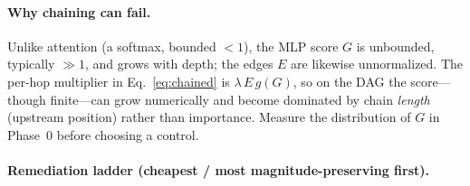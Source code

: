 \documentclass[11pt]{article}
\begin{document}
\paragraph{Why chaining can fail.} Unlike attention (a softmax, bounded ${<}1$), the MLP score $G$ is
unbounded, typically ${\gg}1$, and grows with depth; the edges $E$ are likewise unnormalized. The
per-hop multiplier in Eq.~\eqref{eq:chained} is $\lambda\,E\,g(G)$, so on the DAG the score---though
finite---can grow numerically and become dominated by chain \emph{length} (upstream position) rather
than importance. Measure the distribution of $G$ in Phase~0 before choosing a control.

\paragraph{Remediation ladder (cheapest / most magnitude-preserving first).}
\end{document}
